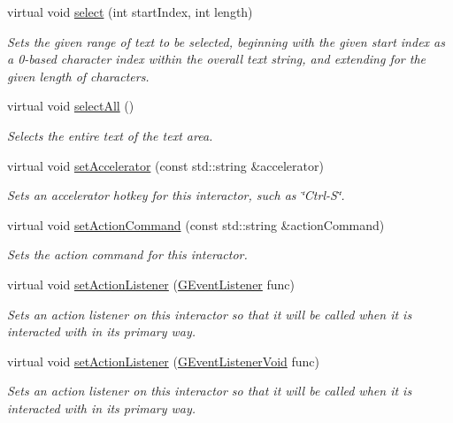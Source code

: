 \begin{DoxyCompactItemize}
virtual void \mbox{\hyperlink{classsgl_1_1GTextArea_aaeb1320c0553d0d2b8081b750f59a34a}{select}} (int start\+Index, int length)
\begin{DoxyCompactList}\small\item\em Sets the given range of text to be selected, beginning with the given start index as a 0-\/based character index within the overall text string, and extending for the given length of characters. \end{DoxyCompactList}\item 
virtual void \mbox{\hyperlink{classsgl_1_1GTextArea_ab6658ed404200bd7aaca5629db064645}{select\+All}} ()
\begin{DoxyCompactList}\small\item\em Selects the entire text of the text area. \end{DoxyCompactList}\item 
virtual void \mbox{\hyperlink{classsgl_1_1GInteractor_ad15f102f62e2960576012f1aa0ba4b2e}{set\+Accelerator}} (const std\+::string \&accelerator)
\begin{DoxyCompactList}\small\item\em Sets an accelerator hotkey for this interactor, such as \char`\"{}\+Ctrl-\/\+S\char`\"{}. \end{DoxyCompactList}\item 
virtual void \mbox{\hyperlink{classsgl_1_1GInteractor_a4b5843fe3030e038a1ba54cc03389bcf}{set\+Action\+Command}} (const std\+::string \&action\+Command)
\begin{DoxyCompactList}\small\item\em Sets the action command for this interactor. \end{DoxyCompactList}\item 
virtual void \mbox{\hyperlink{classsgl_1_1GInteractor_adcfb4742430c88714fcf57e57ab8ea9c}{set\+Action\+Listener}} (\mbox{\hyperlink{namespacesgl_ae9f3e9eab70035da1a2b114e21357b25}{G\+Event\+Listener}} func)
\begin{DoxyCompactList}\small\item\em Sets an action listener on this interactor so that it will be called when it is interacted with in its primary way. \end{DoxyCompactList}\item 
virtual void \mbox{\hyperlink{classsgl_1_1GInteractor_aebd20a89c7a8a43a6fce999cf4f9fcf2}{set\+Action\+Listener}} (\mbox{\hyperlink{namespacesgl_a54427ce97bb1c2804e4fe2b0a62e8b17}{G\+Event\+Listener\+Void}} func)
\begin{DoxyCompactList}\small\item\em Sets an action listener on this interactor so that it will be called when it is interacted with in its primary way. \end{DoxyCompactList}\item 

\end{DoxyCompactItemize}
